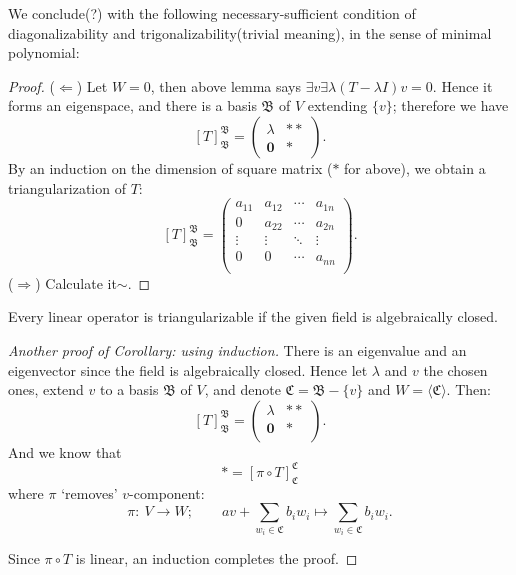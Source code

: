 We conclude(?) with the following necessary-sufficient condition of diagonalizability and trigonalizability(trivial meaning), in the sense of minimal polynomial:
\begin{proof}
($\Longleftarrow$) Let $W=0$, then above lemma says $\exists v \exists \lambda (T - \lambda I) v = 0.$ Hence it forms an eigenspace, and there is a basis $\mathfrak B$ of $V$ extending $\{v\}$; therefore we have $$[T]_\mathfrak B ^ \mathfrak B = \begin{pmatrix} \lambda & ** \\ \mathbf 0 & * \end{pmatrix}.$$ By an induction on the dimension of square matrix ($*$ for above), we obtain a triangularization of $T$: $$[T]_\mathfrak B ^ \mathfrak B = \begin{pmatrix}
a_{11} & a_{12} & \cdots & a_{1n} \\
      0     & a_{22} & \cdots & a_{2n} \\
\vdots & \vdots & \ddots & \vdots \\
      0     &       0     & \cdots & a_{nn} \\
\end{pmatrix}.$$ 
($\Longrightarrow$) Calculate it$\sim$.
\end{proof}
\begin{coro}Every linear operator is triangularizable if the given field is algebraically closed.\end{coro}
\begin{proof}[Another proof of Corollary: using induction]
There is an eigenvalue and an eigenvector since the field is algebraically closed. Hence let $\lambda$ and $v$ the chosen ones, extend $v$ to a basis $\mathfrak B$ of $V$, and denote $\mathfrak C = \mathfrak B - \{v\}$ and $W = \langle \mathfrak C \rangle$. Then:
$$[T]_\mathfrak B ^ \mathfrak B = \begin{pmatrix}
\lambda & ** \\
\mathbf 0 & * \\
\end{pmatrix}.$$ And we know that $$* = [\pi \circ T]_{\mathfrak C}^{\mathfrak C}$$ where $\pi$ `removes' $v$-component: $$\pi:~V\to W;\qquad av + \sum_{w_i\in \mathfrak C} b_i w_i \mapsto  \sum_{w_i\in \mathfrak C} b_i w_i.$$
\begin{center}
\leavevmode
\xy
{}
\endxy
\end{center} 
Since $\pi\circ T$ is linear, an induction completes the proof.
\end{proof}

